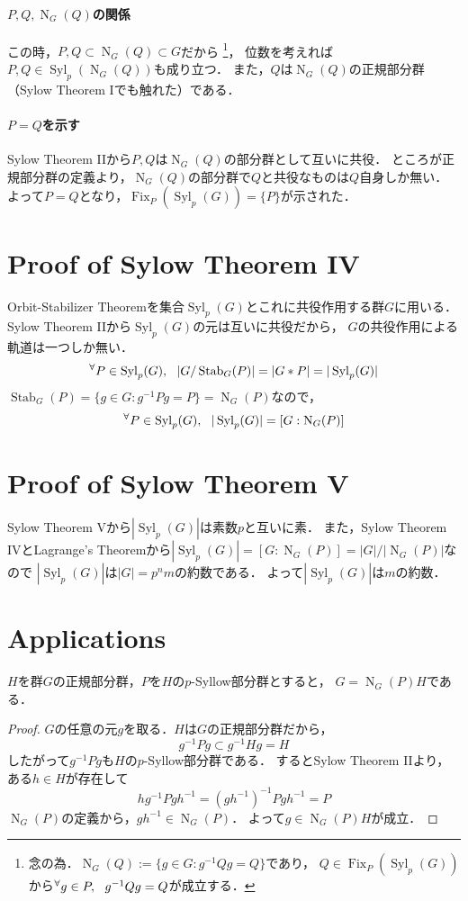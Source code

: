 \documentclass[a4paper]{jsarticle}
\newcommand{\Stab}{\operatorname{Stab}}
\newcommand{\Fix}{\operatorname{Fix}}
\newcommand{\Norm}{\operatorname{N}}
\newcommand{\Syl}{\operatorname{Syl}}
\begin{document}
    \paragraph{$P, Q, \Norm_G(Q)$の関係}
    この時，$P,Q \subset \Norm_G(Q) \subset G$だから
    \footnote
    {
        念の為．$\Norm_G(Q):=\{ g \in G : g^{-1}Qg=Q \}$であり，
        $Q \in \Fix_P(\Syl_p(G))$から${}^{\forall} g \in P,~~ g^{-1}Qg=Q$が成立する．
    }，
    位数を考えれば$P,Q \in \Syl_p(\Norm_G(Q))$も成り立つ．
    また，$Q$は$\Norm_G(Q)$の正規部分群（Sylow Theorem Iでも触れた）である．

    \paragraph{$P=Q$を示す}
    Sylow Theorem IIから$P,Q$は$\Norm_G(Q)$の部分群として互いに共役．
    ところが正規部分群の定義より，$\Norm_G(Q)$の部分群で$Q$と共役なものは$Q$自身しか無い．
    よって$P=Q$となり，$\Fix_P(\Syl_p(G))=\{ P \}$が示された．
    

    \section{Proof of Sylow Theorem IV}
    Orbit-Stabilizer Theoremを集合$\Syl_p(G)$とこれに共役作用する群$G$に用いる．
    Sylow Theorem IIから$\Syl_p(G)$の元は互いに共役だから，
    $G$の共役作用による軌道は一つしか無い．
    \[ \Forall{P \in \Syl_p(G)} |G/\Stab_G(P)|=|G \ast P|=|\Syl_p(G)|\]
    $\Stab_G(P)=\{ g \in G : g^{-1}Pg=P \}=\Norm_G(P)$なので，
    \[ \Forall{P \in \Syl_p(G)} |\Syl_p(G)|=[G:\Norm_G(P)] \]
    

    \section{Proof of Sylow Theorem V}
    Sylow Theorem Vから$|\Syl_p(G)|$は素数$p$と互いに素．
    また，Sylow Theorem IVとLagrange's Theoremから$|\Syl_p(G)|=[G:\Norm_G(P)]=|G|/|\Norm_G(P)|$なので
    $|\Syl_p(G)|$は$|G|=p^n m$の約数である．
    よって$|\Syl_p(G)|$は$m$の約数．
    

    \section{Applications}
    \begin{Lemma}
        $H$を群$G$の正規部分群，$P$を$H$の$p$-Syllow部分群とすると，
        $G=\Norm_G(P)H$である．
    \end{Lemma}
    \begin{proof}
        $G$の任意の元$g$を取る．$H$は$G$の正規部分群だから，
        \[ g^{-1}Pg \subset g^{-1}Hg=H \]
        したがって$g^{-1}Pg$も$H$の$p$-Syllow部分群である．
        するとSylow Theorem IIより，ある$h \in H$が存在して
        \[ hg^{-1} P gh^{-1} = (gh^{-1})^{-1} P gh^{-1} = P \]
        $\Norm_G(P)$の定義から，$gh^{-1} \in \Norm_G(P)$．
        よって$g \in \Norm_G(P)H$が成立．
        
    \end{proof}
\end{document}
